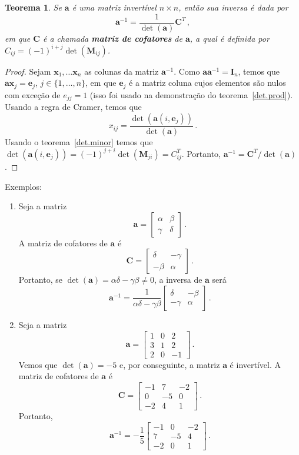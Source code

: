 \documentclass[12pt,a4paper]{report}
\newcommand{\mb}{\mathbf}
\newtheorem{thm}{Teorema}[chapter]
\begin{document}
\begin{thm}
  Se $\mb a$ é uma matriz invertível $n\times n$, então sua inversa é dada por
  $$\mb a^{-1}=\frac{1}{\det(\mb a)}\mb C^T\,,$$
  em que $\mb C$ é a chamada \textbf{matriz de cofatores} de $\mb a$, a qual é definida por $C_{ij}=(-1)^{i+j}\det(\mb M_{ij})$.
\end{thm}
\begin{proof}
  Sejam $\mb x_1,\ldots\mb x_n$ as colunas da matriz $\mb a^{-1}$. Como $\mb a\mb a^{-1}=\mb I_n$, temos que $\mb a\mb x_j=\mb e_j$, $j\in\{1,\ldots,n\}$, em que $\mb e_j$ é a matriz coluna cujos elementos são nulos com exceção de $e_{jj}=1$ (isso foi usado na demonstração do teorema~\ref{det.prod}). Usando a regra de Cramer, temos que
  $$x_{ij}=\frac{\det(\mb a(i,\mb e_j))}{\det(\mb a)}\,.$$
  Usando o teorema~\ref{det.minor} temos que $\det(\mb a(i,\mb e_j))=(-1)^{j+i}\det(\mb M_{ji})=C_{ij}^T$. Portanto, $\mb a^{-1}=\mb C^T/\det(\mb a)$.
\end{proof}

Exemplos:
\begin{enumerate}
  \item Seja a matriz
  $$\mb a=\begin{bmatrix}
    \alpha&\beta\\
    \gamma&\delta
  \end{bmatrix}\,.$$
  A matriz de cofatores de $\mb a$ é
  $$\mb C=\begin{bmatrix}
    \delta&-\gamma\\
    -\beta&\alpha
  \end{bmatrix}\,.$$
  Portanto, se $\det(\mb a)=\alpha\delta-\gamma\beta\ne 0$, a inversa de $\mb a$ será
  $$\mb a^{-1}=\frac{1}{\alpha\delta-\gamma\beta}\begin{bmatrix}
    \delta&-\beta\\
    -\gamma&\alpha
  \end{bmatrix}\,.$$
  \item Seja a matriz
  $$\mb a=\begin{bmatrix}
    1&0&2\\
    3&1&2\\
    2&0&-1
  \end{bmatrix}\,.$$
  Vemos que $\det(\mb a)=-5$ e, por conseguinte, a matriz $\mb a$ é invertível. A matriz de cofatores de $\mb a$ é
  $$\mb C=\begin{bmatrix}
    -1&7&-2\\
    0&-5&0\\
    -2&4&1
  \end{bmatrix}\,.$$
  Portanto,
  $$\mb a^{-1}=-\frac{1}{5}\begin{bmatrix}
    -1&0&-2\\
    7&-5&4\\
    -2&0&1
  \end{bmatrix}\,.$$
\end{enumerate}
\end{document}
